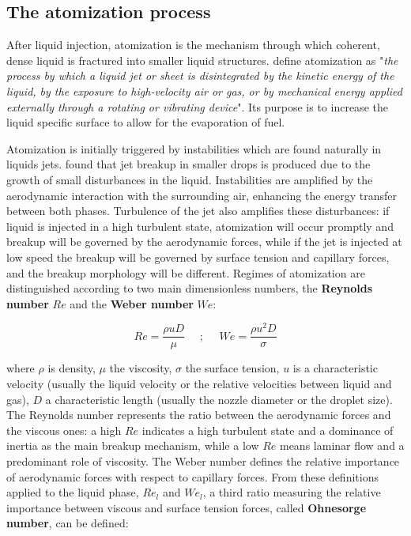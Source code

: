 \subsection*{The atomization process}

After liquid injection, atomization is the mechanism through which coherent, dense liquid is fractured into smaller liquid structures.  define atomization as "\textsl{the process by which a liquid jet or sheet is disintegrated by the kinetic energy of the liquid, by the exposure to
high-velocity air or gas, or by mechanical energy applied externally through a rotating or vibrating device}". Its purpose is to increase the liquid specific surface to allow for the evaporation of fuel.

Atomization is initially triggered by instabilities which are found naturally in liquids jets.  found that jet breakup in smaller drops is produced due to the growth of small disturbances in the liquid. Instabilities are amplified by the aerodynamic interaction with the surrounding air, enhancing the energy transfer between both phases. Turbulence of the jet also amplifies these disturbances: if liquid is injected in a high turbulent state, atomization will occur promptly and breakup will be governed by the aerodynamic forces, while if the jet is injected at low speed the breakup will be governed by surface tension and capillary forces, and the breakup morphology will be different. Regimes of atomization are distinguished according to two main dimensionless numbers, the \textbf{Reynolds number} $Re$ and the \textbf{Weber number} $We$:

\begin{equation}
	Re = \frac{\rho u D}{\mu} ~~~~~~ ;  ~~~~~~ We = \frac{\rho u^2 D}{\sigma}
\end{equation}

where $\rho$ is density, $\mu$ the viscosity, $\sigma$ the surface tension, $u$ is a characteristic velocity (usually the liquid velocity or the relative velocities between liquid and gas), $D$ a characteristic length (usually the nozzle diameter or the droplet size). The Reynolds number represents the ratio between the aerodynamic forces and the viscous ones: a high $Re$ indicates a high turbulent state and a dominance of inertia as the main breakup mechanism, while a low $Re$ means laminar flow and a predominant role of viscosity. The Weber number defines the relative importance of aerodynamic forces with respect to capillary forces. From these definitions applied to the liquid phase, $Re_l$ and $We_l$, a third ratio measuring the relative importance between viscous and surface tension forces, called \textbf{Ohnesorge number}, can be defined:


